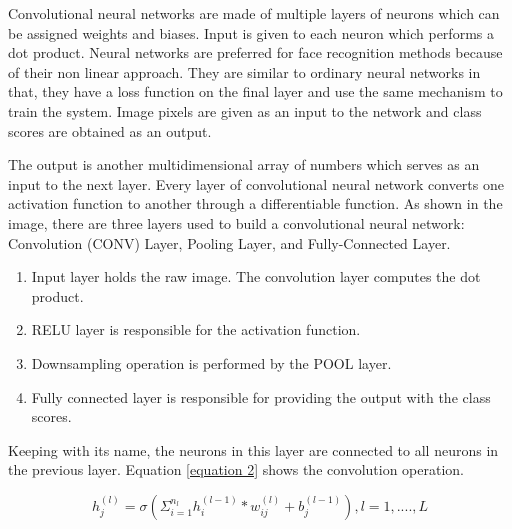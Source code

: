 \documentclass[conference]{IEEEtran}
\begin{document}
Convolutional neural networks are made of multiple layers of neurons which can be assigned weights and biases. Input is given to each neuron which performs a dot product. Neural networks are preferred for face recognition methods because of their non linear approach. They are similar to ordinary neural networks in that, they have a loss function on the final layer and use the same mechanism to train the system. Image pixels are given as an input to the network and class scores are obtained as an output. 


 The output is another multidimensional array of numbers which serves as an input to the next layer. Every layer of convolutional neural network converts one activation function to another through a differentiable function. As shown in the image, there are three layers used to build a convolutional neural network: Convolution (CONV) Layer, Pooling Layer, and Fully-Connected Layer. 
 
\begin{enumerate}

\item Input layer holds the raw image. The convolution layer computes the dot product.
\item RELU layer is responsible for the activation function.
\item Downsampling operation is performed by the POOL layer.
\item  Fully connected layer is responsible for providing the output with the class scores.
\end{enumerate}

    Keeping with its name, the neurons in this layer are connected to all neurons in the previous layer. Equation \ref{equation 2} shows the convolution operation.
 

\begin{equation}
\label{equation 2}
h_j^{(l)} = \sigma(\Sigma_{i=1}^{n_l} h_i^{(l-1)} * w_{ij}^{(l)} + b_j^{(l-1)}) , l=1,....,L
\end{equation}
\end{document}
